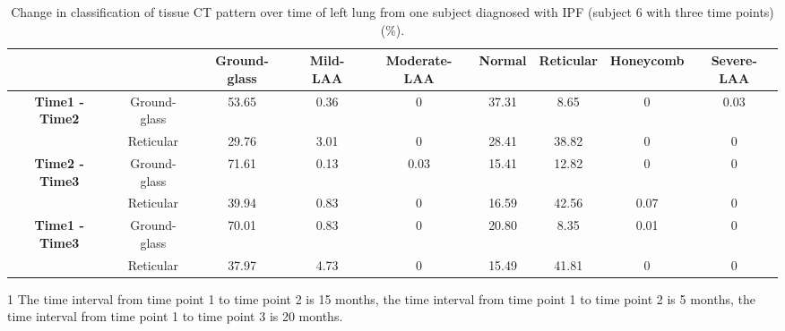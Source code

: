 \begin{landscape}
\begin{table}[p]
\centering
\caption{Change in classification of tissue CT pattern over time of left lung from one subject diagnosed with IPF (subject 6 with three time points) (\%).}
\label{tab:ChangeOverTimeLeft}
\begin{tabular}{c c c c c c c c c}
\hline
\quad & \quad & \bf{Ground-glass} &	\bf{Mild-LAA} &	\bf{Moderate-LAA} &	\bf{Normal} &	\bf{Reticular} &	\bf{Honeycomb} &	\bf{Severe-LAA}\\
\hline
\bf{Time1 - Time2} &	Ground-glass &	53.65 &	0.36 &	0	& 37.31 &	8.65 &	0 &	0.03\\
\quad & Reticular	& 29.76 &	3.01 &	0 &	28.41 &	38.82 &	0 &	0\\
\hline
\bf{Time2 - Time3} &	Ground-glass &	71.61 &	0.13 &	0.03 &	15.41 &	12.82 &	0 &	0\\
\quad & Reticular &	39.94 &	0.83 &	0 &	16.59 &	42.56 &	0.07 &	0\\
\hline
\bf{Time1 - Time3} &	Ground-glass &	70.01 &	0.83 &	0 &	20.80 &	8.35 &	0.01 &	0\\
\quad & Reticular &	37.97 &	4.73 &	0 &	15.49 &	41.81 &	0 &	0\\
\hline
\end{tabular}
\begin{tablenotes}
  \item[1] The time interval from time point 1 to time point 2 is 15 months, the time interval from time point 1 to time point 2 is 5 months, the time interval from time point 1 to time point 3 is 20 months.
\end{tablenotes}
\end{table}


\end{landscape}
